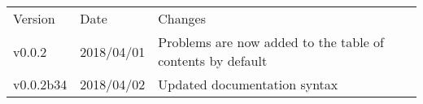\begin{tabular}{lll}
  Version&Date&Changes\\
  v0.0.2&2018/04/01&Problems are now added to the table of contents by default\\
  v0.0.2b34&2018/04/02&Updated documentation syntax
\end{tabular}
